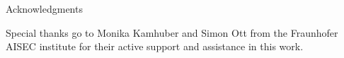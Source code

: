 \thispagestyle{empty}

\vspace*{20mm}

\begin{center}
{ Acknowledgments}
\end{center}

\vspace{10mm}

Special thanks go to Monika Kamhuber and Simon Ott from the Fraunhofer AISEC institute for their active support and assistance in this work.

\cleardoublepage{}
